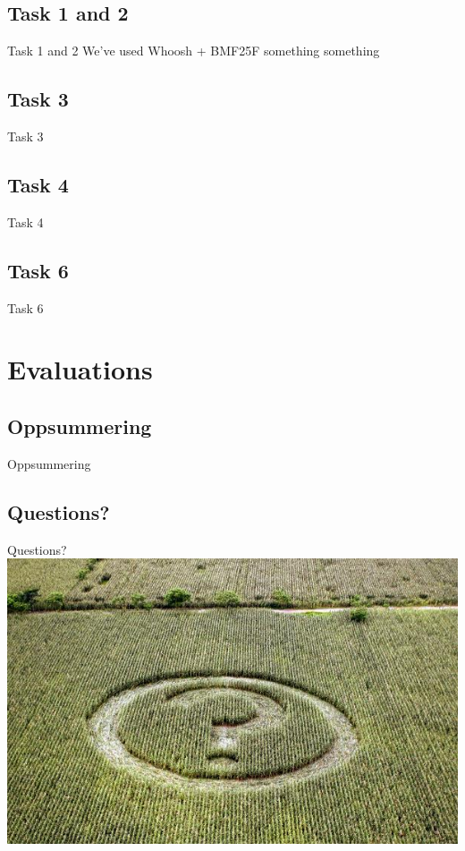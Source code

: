 \documentclass[screen, compress]{beamer}
\begin{document}
\subsection{Task 1 and 2}
\begin{frame}{Task 1 and 2}
We've used Whoosh + BMF25F something something
\end{frame}


\subsection{Task 3}
\begin{frame}{Task 3}
\end{frame}


\subsection{Task 4}
\begin{frame}{Task 4}
\end{frame}


\subsection{Task 6}
\begin{frame}{Task 6}
\end{frame}


\section{Evaluations}

\subsection{Oppsummering}
\begin{frame}{Oppsummering}
\end{frame}


\subsection{Questions?}
\begin{frame}{Questions?}
\includegraphics[width=\textwidth]{img/any-questions}
\end{frame}
\end{document}
